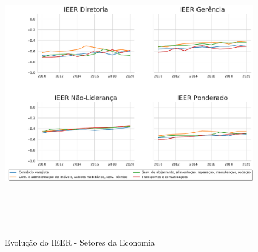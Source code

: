     \begin{figure}[htb!]
        \centering
        \caption{Evolução do IEER - Setores da Economia}
            \includegraphics[height=12cm]{images/ieer_brasil_setor_2010_2020.pdf}
        \label{fig1}
    \end{figure}